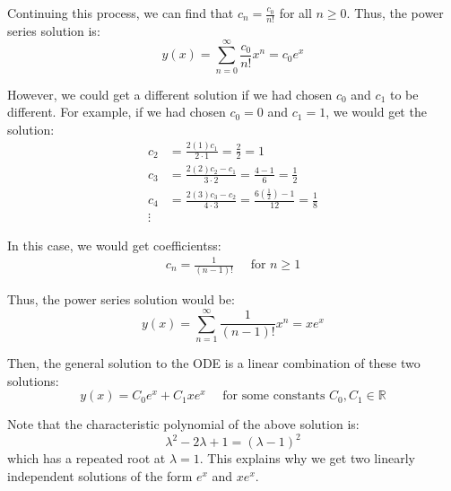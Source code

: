 {    Continuing this process, we can find that $c_n = \frac{c_0}{n!}$ for all $n \geq 0$. Thus, the power series solution is:
    \begin{equation*}
        y(x) = \sum_{n=0}^{\infty} \frac{c_0}{n!} x^n = c_0 e^x
    \end{equation*}

    However, we could get a different solution if we had chosen $c_0$ and $c_1$ to be different. For example, if we had chosen $c_0 = 0$ and $c_1 = 1$, we would get the solution:
    \begin{align*}
        c_2 &= \frac{2(1) c_1}{2 \cdot 1} = \frac{2}{2} = 1 \\
        c_3 &= \frac{2(2) c_2 - c_1}{3 \cdot 2} = \frac{4 - 1}{6} = \frac{1}{2} \\
        c_4 &= \frac{2(3) c_3 - c_2}{4 \cdot 3} = \frac{6 (\frac{1}{2}) - 1}{12} = \frac{1}{8}  \\
        \vdots
    \end{align*}

    In this case, we would get coefficientss:
    \begin{align*}
        c_n = \frac{1}{(n-1)!} \quad \text{ for } n \geq 1
    \end{align*}

    Thus, the power series solution would be:
    \begin{equation*}
        y(x) = \sum_{n=1}^{\infty} \frac{1}{(n-1)!} x^n = x e^x
    \end{equation*}

    Then, the general solution to the ODE is a linear combination of these two solutions:
    \begin{equation*}
        y(x) = C_0 e^x + C_1 x e^x \quad \text{ for some constants } C_0, C_1 \in \mathbb{R}
    \end{equation*}

    Note that the characteristic polynomial of the above solution is:
\begin{equation*}
\lambda^2 - 2 \lambda + 1 = (\lambda - 1)^2
\end{equation*}
which has a repeated root at $\lambda = 1$. This explains why we get two linearly independent solutions of the form $e^x$ and $x e^x$.


}

